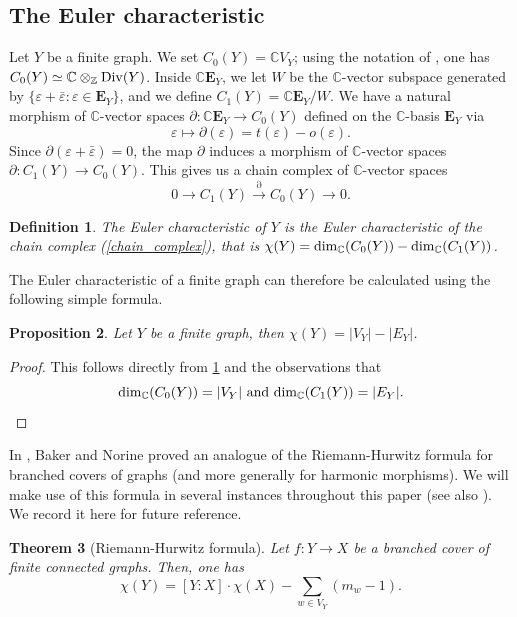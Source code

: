 \documentclass[11pt]{amsart}
\newtheorem{theorem}{Theorem}[section]
\newtheorem{proposition}[theorem]{Proposition}
\newtheorem{definition}[theorem]{Definition}
\numberwithin{equation}{section}
\theoremstyle{remark}
\theoremstyle{definition}
\begin{document}
\subsection{The Euler characteristic} \label{section:the}
Let $Y$ be a finite graph.  We set $C_{0}(Y) = \mathbb{C}V_{Y}$; using the notation of \cite{Gambheera/Vallieres:2024}, one has $C_{0}(Y) \simeq \mathbb{C} \otimes_{\mathbb{Z}} {\rm Div}(Y)$.  Inside $\mathbb{C}\mathbf{E}_{Y}$, we let $W$ be the $\mathbb{C}$-vector subspace generated by $\{\varepsilon + \bar{\varepsilon} : \varepsilon \in \mathbf{E}_{Y} \}$, and we define $C_{1}(Y) = \mathbb{C}\mathbf{E}_{Y}/W$.  We have a natural morphism of $\mathbb{C}$-vector spaces $\partial: \mathbb{C}\mathbf{E}_{Y} \rightarrow C_{0}(Y)$ defined on the $\mathbb{C}$-basis $\mathbf{E}_{Y}$ via
$$\varepsilon \mapsto \partial(\varepsilon) = t(\varepsilon) - o(\varepsilon). $$
Since $\partial(\varepsilon + \bar{\varepsilon}) = 0$, the map $\partial$ induces a morphism of $\mathbb{C}$-vector spaces $\partial:C_{1}(Y) \rightarrow C_{0}(Y)$.  This gives us a chain complex of $\mathbb{C}$-vector spaces
\begin{equation} \label{chain_complex}
0 \rightarrow C_{1}(Y) \stackrel{\partial}{\longrightarrow} C_{0}(Y) \rightarrow 0. 
\end{equation}
\begin{definition} \label{def_euler_char}
The Euler characteristic of $Y$ is the Euler characteristic of the chain complex (\ref{chain_complex}), that is $\chi(Y) = {\rm dim}_{\mathbb{C}}(C_{0}(Y)) - {\rm dim}_{\mathbb{C}}(C_{1}(Y))$.
\end{definition}

The Euler characteristic of a finite graph can therefore be calculated using the following simple formula.
\begin{proposition} \label{eul_form}
Let $Y$ be a finite graph, then $\chi(Y) = |V_{Y}| - |E_{Y}|$.
\end{proposition}
\begin{proof}
This follows directly from \cref{def_euler_char} and the observations that
$${\rm dim}_{\mathbb{C}}(C_{0}(Y)) = |V_{Y}| \text{ and } {\rm dim}_{\mathbb{C}}(C_{1}(Y)) = |E_{Y}|. $$
\end{proof}
In \cite{Baker/Norine:2009}, Baker and Norine proved an analogue of the Riemann-Hurwitz formula for branched covers of graphs (and more generally for harmonic morphisms).  We will make use of this formula in several instances throughout this paper (see also \cite[Theorem 5.12]{Sunada:2013}).  We record it here for future reference.
\begin{theorem}[Riemann-Hurwitz formula] \label{riemann_hurwitz}
Let $f:Y \rightarrow X$ be a branched cover of finite connected graphs.  Then, one has
$$\chi(Y) = [Y:X] \cdot \chi(X) - \sum_{w \in V_{Y}}(m_{w}-1).$$
\end{theorem}
\end{document}
